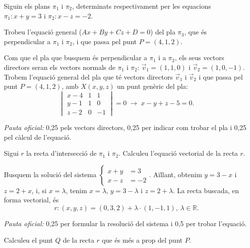 Siguin els plans $\pi_1$ i $\pi_2$, determinats respectivament per les equacions $\pi_1\colon x+y=3$ i $\pi_2\colon x-z=-2$.

\begin{apartats}

Trobeu l'equació general ($Ax+By+Cz+D=0$) del pla $\pi_3$, que és perpendicular a $\pi_1$ i $\pi_2$, i que passa pel punt
$P=(4,1,2)$.

\begin{solucio}
Com que el pla que busquem és perpendicular a $\pi_1$ i a $\pi_2$, els seus vectors directors seran els vectors normals
de $\pi_1$ i $\pi_2$: $\vec v_1=(1,1,0)$ i $\vec v_2=(1,0,-1)$. Trobem l'equació general del pla que té vectors directors
$\vec v_1$ i $\vec v_2$ i que passa pel punt $P=(4,1,2)$, amb $X(x,y,z)$ un punt genèric del pla:
\[
\begin{vmatrix}x-4&1&1\\y-1&1&0\\z-2&0&-1\end{vmatrix}=0\;\rightarrow\;\boxed{x-y+z-5=0}.
\]

\textit{Pauta oficial:} 0,25 pels vectors directors, 0,25 per indicar com trobar el pla i 0,25 pel càlcul de l'equació.
\end{solucio}

Sigui $r$ la recta d'intersecció de $\pi_1$ i $\pi_2$. Calculeu l'equació vectorial de la recta $r$.

\begin{solucio}
Busquem la solució del sistema $\left\{\begin{aligned}x+y&=3\\x-z&=-2\end{aligned}\right.$. Aïllant, obtenim $y=3-x$ i
$z=2+x$, i, si $x=\lambda$, tenim $x=\lambda$, $y=3-\lambda$ i $z=2+\lambda$. La recta buscada, en forma vectorial, és
\[
\boxed{r\colon(x,y,z)=(0,3,2)+\lambda\cdot(1,-1,1),\ \lambda\in\mathbb{R}}.
\]

\textit{Pauta oficial:} 0,25 per formular la resolució del sistema i 0,5 per trobar l'equació.
\end{solucio}

Calculeu el punt $Q$ de la recta $r$ que és més a prop del punt $P$.


\end{apartats}
